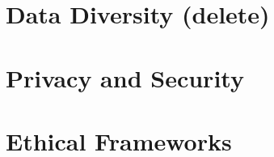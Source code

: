 \documentclass[
]{book}
\begin{document}
\hypertarget{data-diversity-delete}{%
\section{Data Diversity (delete)}\label{data-diversity-delete}}

\hypertarget{privacy-and-security}{%
\section{Privacy and Security}\label{privacy-and-security}}

\hypertarget{ethical-frameworks}{%
\section{Ethical Frameworks}\label{ethical-frameworks}}

  
\end{document}

